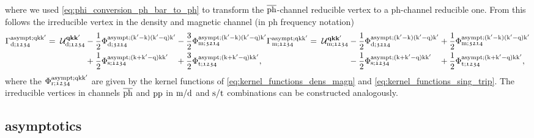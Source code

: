 \documentclass[../../main.tex]{subfiles}
\begin{document}
where we used \eqref{eq:phi_conversion_ph_bar_to_ph} to transform the $\overline{\text{ph}}$-channel reducible vertex to a ph-channel reducible one. From this follows the irreducible vertex in the density and magnetic channel (in ph frequency notation) \cite{Tagliavini2018}
\begin{subequations}
\begin{equation}
\begin{alignedat}{3}
	\Gamma^{\asympt;\q\k\kp}_{\dens;\mathfrak{1234}}&=\;\mathcal{U}^{\vv{qkk}'}_{\dens;\mathfrak{1234}}&&-\frac12\Phi^{\asympt;(\kp-\k)(\kp-\q)\kp}_{\dens;\mathfrak{3214}}&&-\frac32\Phi^{\asympt;(\kp-\k)(\kp-\q)\kp}_{\magn;\mathfrak{3214}}\\
	&&&+\frac12\Phi_{\sing;\mathfrak{1234}}^{\asympt;(\k+\kp-\q)\k\kp}&&+\frac32\Phi_{\trip;\mathfrak{1234}}^{\asympt;(\k+\kp-\q)\k\kp},
\end{alignedat}
\end{equation}\\[-0.6cm]%
\begin{equation}
\begin{alignedat}{3}
	\Gamma^{\asympt;\q\k\kp}_{\magn;\mathfrak{1234}}&=\;\mathcal{U}^{\vv{qkk}'}_{\magn;\mathfrak{1234}} &&-\frac12\Phi^{\asympt;(\kp-\k)(\kp-\q)\kp}_{\dens;\mathfrak{3214}}&&+\frac12\Phi^{\asympt;(\kp-\k)(\kp-\q)\kp}_{\magn;\mathfrak{3214}}\\
	&&&-\frac12\Phi_{\sing;\mathfrak{1234}}^{\asympt;(\k+\kp-\q)\k\kp}&&+\frac12\Phi_{\trip;\mathfrak{1234}}^{\asympt;(\k+\kp-\q)\k\kp},
\end{alignedat}
\end{equation}
\end{subequations}
where the $\Phi_{\text{r};\mathfrak{1234}}^{\text{asympt};\text{q}\text{k}\text{k}'}$ are given by the kernel functions of \eqref{eq:kernel_functions_dens_magn} and \eqref{eq:kernel_functions_sing_trip}. The irreducible vertices in channels $\overline{\text{ph}}$ and $\text{pp}$ in $\text{m}/\text{d}$ and $\text{s}/\text{t}$ combinations can be constructed analogously. 

\subsection{ asymptotics}\label{sec:vertex_asymptotics_urange}
\end{document}
